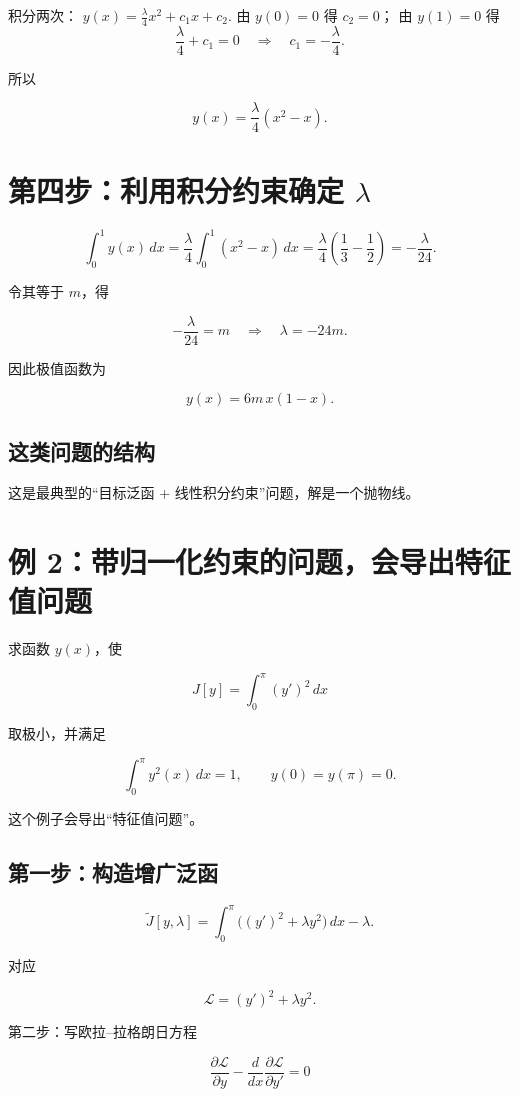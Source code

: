 积分两次： \(y(x)=\frac{\lambda}{4}x^2+c_1x+c_2\).
由 \(y(0)=0\) 得 \(c_2=0\)；
由 \(y(1)=0\) 得\[
\frac{\lambda}{4}+c_1=0
\quad\Longrightarrow\quad
c_1=-\frac{\lambda}{4}.
\]

所以

\[
y(x)=\frac{\lambda}{4}(x^2-x).
\]

\section{第四步：利用积分约束确定 \(\lambda\)}

\[
\int_0^1 y(x)\,dx
=
\frac{\lambda}{4}\int_0^1 (x^2-x)\,dx
=
\frac{\lambda}{4}\left(\frac13-\frac12\right)
=
-\frac{\lambda}{24}.
\]

令其等于 \(m\)，得

\[
-\frac{\lambda}{24}=m
\quad\Longrightarrow\quad
\lambda=-24m.
\]

因此极值函数为

\[
\boxed{
y(x)=6m\,x(1-x)
}.
\]

\subsection{这类问题的结构}

这是最典型的“目标泛函 + 线性积分约束”问题，解是一个抛物线。

\section{例 2：带归一化约束的问题，会导出特征值问题}

求函数 \(y(x)\)，使

\[
J[y]=\int_0^\pi (y')^2\,dx
\]

取极小，并满足

\[
\int_0^\pi y^2(x)\,dx=1,
\qquad
y(0)=y(\pi)=0.
\]

这个例子会导出“特征值问题”。

\subsection{第一步：构造增广泛函}

\[
\tilde J[y,\lambda]
=
\int_0^\pi \Big((y')^2+\lambda y^2\Big)\,dx-\lambda.
\]

对应

\[
\mathcal L=(y')^2+\lambda y^2.
\]

第二步：写欧拉–拉格朗日方程

\[
\frac{\partial \mathcal L}{\partial y}
-
\frac{d}{dx}\frac{\partial \mathcal L}{\partial y'}
=0
\]

